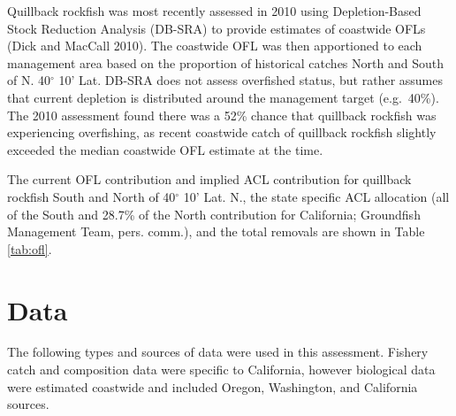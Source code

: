 \documentclass[11pt,
  english,
  a4paper,
]{article}
\begin{document}

Quillback rockfish was most recently assessed in 2010 using Depletion-Based Stock Reduction Analysis (DB-SRA) to provide estimates of coastwide OFLs {(Dick and MacCall 2010)\leavevmode\tagmcend\tagstructend}. The coastwide OFL was then apportioned to each management area based on the proportion of historical catches North and South of N. 40{\(^\circ\)\leavevmode\tagmcend\tagstructend} 10' Lat. DB-SRA does not assess overfished status, but rather assumes that current depletion is distributed around the management target (e.g.~40\%). The 2010 assessment found there was a 52\% chance that quillback rockfish was experiencing overfishing, as recent coastwide catch of quillback rockfish slightly exceeded the median coastwide OFL estimate at the time.

\leavevmode\tagmcend\tagstructend\par


The current OFL contribution and implied ACL contribution for quillback rockfish South and North of 40{\(^\circ\)\leavevmode\tagmcend\tagstructend} 10' Lat. N., the state specific ACL allocation (all of the South and 28.7\% of the North contribution for California; Groundfish Management Team, pers. comm.), and the total removals are shown in Table \ref{tab:ofl}.

\leavevmode\tagmcend\tagstructend\par


\hypertarget{data}{%
\section{Data}\label{data}}

\leavevmode\tagmcend\tagstructend


The following types and sources of data were used in this assessment. Fishery catch and composition data were specific to California, however biological data were estimated coastwide and included Oregon, Washington, and California sources.

\leavevmode\tagmcend\tagstructend\par
\end{document}
